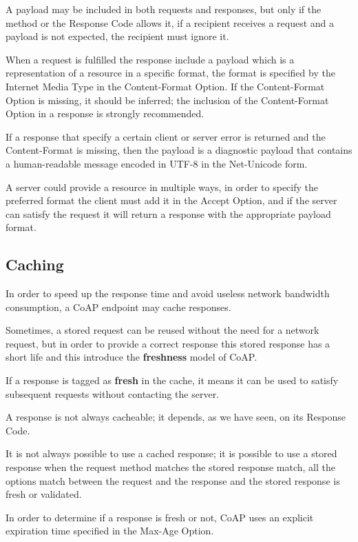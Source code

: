 	
	
	A payload may be included in both requests and responses, but only if the method or the Response Code allows it, if a recipient receives a request and a payload is not expected, the recipient must ignore it.
	
	When a request is fulfilled the response include a payload which is a representation of a resource in a specific format, the format is specified by the Internet Media Type in the Content-Format Option.\newline
	If the Content-Format Option is missing, it should be inferred; the inclusion of the Content-Format Option in a response is strongly recommended.
	
	If a response that specify a certain client or server error is returned and the Content-Format is missing, then the payload is a diagnostic payload that contains a human-readable message encoded in UTF-8 in the Net-Unicode form.
	
	A server could provide a resource in multiple ways, in order to specify the preferred format the client must add it in the Accept Option, and if the server can satisfy the request it will return a response with the appropriate payload format.
	
	\subsection{Caching}
	In order to speed up the response time and avoid useless network bandwidth consumption, a CoAP endpoint may cache responses.
	
	Sometimes, a stored request can be reused without the need for a network request, but in order to provide a correct response this stored response has a short life and this introduce the \textbf{freshness} model of CoAP.
	
	If a response is tagged as \textbf{fresh} in the cache, it means it can be used to satisfy subsequent requests without contacting the server.
	
	A response is not always cacheable; it depends, as we have seen, on its Response Code.
	
	It is not always possible to use a cached response; it is possible to use a stored response when the request method matches the stored response match, all the options match between the request and the response and the stored response is fresh or validated.
	
	In order to determine if a response is fresh or not, CoAP uses an explicit expiration time specified in the Max-Age Option.
	
